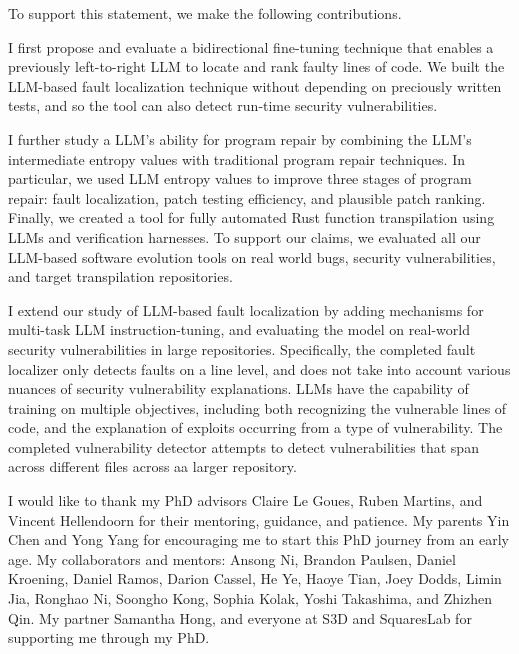\documentclass[12pt,openany,oneside,table]{cmuthesis}
\begin{document}
To support this statement, we make the following contributions. 

I first propose and evaluate a bidirectional fine-tuning technique that enables a previously left-to-right LLM to locate and rank faulty lines of code. We built the LLM-based fault localization technique without depending on preciously written tests, and so the tool can also detect run-time security vulnerabilities. 

I further study a LLM's ability for program repair by combining the LLM's intermediate entropy values with traditional program repair techniques. In particular, we used LLM entropy values to improve three stages of program repair: fault localization, patch testing efficiency, and plausible patch ranking. Finally, we created a tool for fully automated Rust function transpilation using LLMs and verification harnesses. To support our claims, we evaluated all our LLM-based software evolution tools on real world bugs, security vulnerabilities, and target transpilation repositories.

I extend our study of LLM-based fault localization by adding mechanisms for multi-task LLM instruction-tuning, and evaluating the model on real-world security vulnerabilities in large repositories. Specifically, the completed fault localizer only detects faults on a line level, and does not take into account various nuances of security vulnerability explanations. LLMs have the capability of training on multiple objectives, including both recognizing the vulnerable lines of code, and the explanation of exploits occurring from a type of vulnerability. The completed vulnerability detector attempts to detect vulnerabilities that span across different files across aa larger repository. 

\begin{acknowledgments}
    I would like to thank my PhD advisors Claire Le Goues, Ruben Martins, and Vincent Hellendoorn for their mentoring, guidance, and patience. My parents Yin Chen and Yong Yang for encouraging me to start this PhD journey from an early age. My collaborators and mentors:
    Ansong Ni, Brandon Paulsen, Daniel Kroening, Daniel Ramos, Darion Cassel, He Ye, Haoye Tian, Joey Dodds, Limin Jia, Ronghao Ni, Soongho Kong, Sophia Kolak, Yoshi Takashima, and Zhizhen Qin. My partner Samantha Hong, and everyone at S3D and SquaresLab for supporting me through my PhD.
\end{acknowledgments}

\tableofcontents
\end{document}
